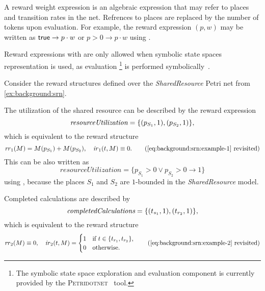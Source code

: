 A reward weight expression is an algebraic expression that may refer
to places and transition rates in the net. Refrences to places are
replaced by the number of tokens upon evaluation. For example, the
reward expression $(p, w)$ may be written as
$\textsf{true} \rightarrow p \cdot w$ or $p > 0 \rightarrow p \cdot w$ using
.

Reward expressions with  are only allowed when symbolic
state spaces representation is used, as  evaluation%
\footnote{The symbolic state space exploration and 
  evaluation component is currently provided by the
  \textsc{Petridotnet}~\citep{Petridotnet} tool.} is performed
symbolically~\citep{TDK2010_Darvas}.

\begin{runningExample}
  Consider the reward structures defined over the
  \emph{Shared\-Resource} Petri net from \vref{ex:background:srn}.

  The utilization of the shared resource can be described by the
  reward expression
  \begin{equation}
    \textit{resourceUtilization} = \{ (p_{S_1}, 1), (p_{S_2}, 1)\} \text,
  \end{equation}
  which is equivalent to the  reward structure
  \begin{equation}
    \rateReward_1(M) = M(p_{S_1}) + M(p_{S_2}), \quad
    \impulseReward_1(t, M) \equiv 0 \text.
    \tag{\ref{eq:background:srn:example-1} revisited}
  \end{equation}
  This can be also written as
  \begin{equation}
    \textit{resourceUtilization} = \{p_{S_1} > 0 \lor p_{S_2} > 0
    \rightarrow 1\}
  \end{equation}
  using , because the places $S_1$ and $S_2$ are
  $1$-bounded in the \emph{Shared\-Resource} model.

  Completed calculations are described by
  \begin{equation}
    \textit{completedCalculations} = \{ (t_{s_1}, 1), (t_{r_2}, 1)\} \text,
  \end{equation}
  which is equivalent to the reward structure
  \begin{equation}
    \rateReward_2(M) \equiv 0, \quad \impulseReward_2(t, M) = \begin{cases}
      1 & \text{if $t \in \{t_{r_1}, t_{r_2}\}$,} \\
      0 & \text{otherwise.}
    \end{cases}
    \tag{\ref{eq:background:srn:example-2} revisited}
  \end{equation}
\end{runningExample}

